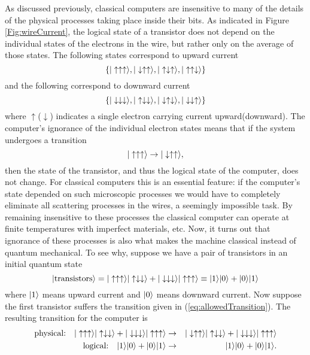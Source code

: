 As discussed previously, classical computers are insensitive to many of the details of the physical processes taking place inside their bits.
As indicated in Figure \ref{Fig:wireCurrent}, the logical state of a transistor does not depend on the individual states of the electrons in the wire, but rather only on the average of those states.
The following states correspond to upward current \begin{equation}
\left\lbrace |\uparrow \uparrow \uparrow\rangle, |\downarrow \uparrow \uparrow\rangle, |\uparrow \downarrow \uparrow\rangle, |\uparrow \uparrow \downarrow\rangle \right\rbrace \end{equation}
and the following correspond to downward current \begin{equation}
\left\lbrace |\downarrow \downarrow \downarrow\rangle, |\uparrow \downarrow \downarrow\rangle, |\downarrow \uparrow \downarrow\rangle, |\downarrow \downarrow \uparrow\rangle \right\rbrace \end{equation}
where $\uparrow$($\downarrow$) indicates a single electron carrying current upward(downward).
The computer's ignorance of the individual electron states means that if the system undergoes a transition \begin{equation}
|\uparrow \uparrow \uparrow\rangle \rightarrow |\downarrow \uparrow \uparrow\rangle, \label{eq:allowedTransition} \end{equation}
then the state of the transistor, and thus the logical state of the computer, does not change.
For classical computers this is an essential feature: if the computer's state depended on such microscopic processes we would have to completely eliminate all scattering processes in the wires, a seemingly impossible task.
By remaining insensitive to these processes the classical computer can operate at finite temperatures with imperfect materials, etc.
Now, it turns out that ignorance of these processes is also what makes the machine classical instead of quantum mechanical.
To see why, suppose we have a pair of transistors in an initial quantum state \begin{equation}
|\textrm{transistors}\rangle = |\uparrow \uparrow \uparrow\rangle|\uparrow \downarrow \downarrow\rangle + |\downarrow \downarrow \downarrow\rangle|\uparrow \uparrow \uparrow\rangle \equiv |1\rangle|0\rangle + |0\rangle|1\rangle \end{equation}
where $|1\rangle$ means upward current and $|0\rangle$ means downward current. Now suppose the first transistor suffers the transition given in (\ref{eq:allowedTransition}). The resulting transition for the computer is \begin{eqnarray}
\textrm{physical:} \quad |\uparrow \uparrow \uparrow\rangle|\uparrow \downarrow \downarrow\rangle + |\downarrow \downarrow \downarrow\rangle|\uparrow \uparrow \uparrow\rangle & \rightarrow & |\downarrow \uparrow \uparrow\rangle|\uparrow \downarrow \downarrow\rangle + |\downarrow \downarrow \downarrow\rangle|\uparrow \uparrow \uparrow\rangle \nonumber \\
\textrm{logical:} \quad |1\rangle|0\rangle + |0\rangle|1\rangle & \rightarrow & |1\rangle|0\rangle + |0\rangle|1\rangle. \end{eqnarray}
